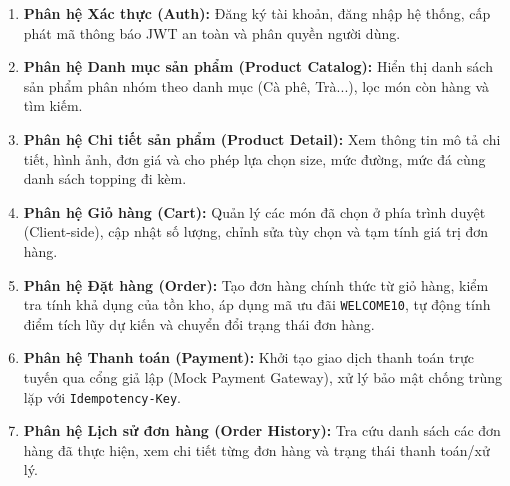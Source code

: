 \begin{enumerate}
    \item \textbf{Phân hệ Xác thực (Auth):} Đăng ký tài khoản, đăng nhập hệ thống, cấp phát mã thông báo JWT an toàn và phân quyền người dùng.
    \item \textbf{Phân hệ Danh mục sản phẩm (Product Catalog):} Hiển thị danh sách sản phẩm phân nhóm theo danh mục (Cà phê, Trà...), lọc món còn hàng và tìm kiếm.
    \item \textbf{Phân hệ Chi tiết sản phẩm (Product Detail):} Xem thông tin mô tả chi tiết, hình ảnh, đơn giá và cho phép lựa chọn size, mức đường, mức đá cùng danh sách topping đi kèm.
    \item \textbf{Phân hệ Giỏ hàng (Cart):} Quản lý các món đã chọn ở phía trình duyệt (Client-side), cập nhật số lượng, chỉnh sửa tùy chọn và tạm tính giá trị đơn hàng.
    \item \textbf{Phân hệ Đặt hàng (Order):} Tạo đơn hàng chính thức từ giỏ hàng, kiểm tra tính khả dụng của tồn kho, áp dụng mã ưu đãi \texttt{WELCOME10}, tự động tính điểm tích lũy dự kiến và chuyển đổi trạng thái đơn hàng.
    \item \textbf{Phân hệ Thanh toán (Payment):} Khởi tạo giao dịch thanh toán trực tuyến qua cổng giả lập (Mock Payment Gateway), xử lý bảo mật chống trùng lặp với \texttt{Idempotency-Key}.
    \item \textbf{Phân hệ Lịch sử đơn hàng (Order History):} Tra cứu danh sách các đơn hàng đã thực hiện, xem chi tiết từng đơn hàng và trạng thái thanh toán/xử lý.
\end{enumerate}

